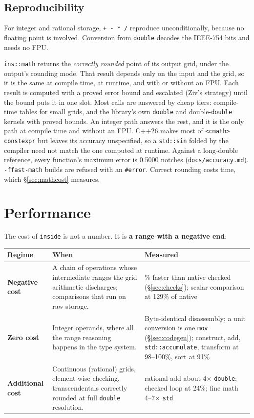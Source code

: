 \documentclass[11pt,a4paper]{article}
\newcommand{\code}[1]{\texttt{\small #1}}
\newcommand{\file}[1]{\texttt{\small #1}}
\begin{document}
\subsection{Reproducibility}

For integer and rational storage, \code{+ - * /} reproduce unconditionally,
because no floating point is involved. Conversion from \code{double} decodes
the IEEE-754 bits and needs no FPU.

\code{ins::math} returns the \emph{correctly rounded} point of its
output grid, under the output's rounding mode. That result depends only on the
input and the grid, so it is the same at compile time, at runtime, and with or
without an FPU. Each result is computed with a proved error bound and escalated
(Ziv's strategy) until the bound puts it in one slot. Most calls are answered
by cheap tiers: compile-time tables for small grids, and the library's own
\code{double} and double-\code{double} kernels with proved bounds. An integer
path answers the rest, and it is the only path at compile time and without an
FPU. C++26 makes most of \code{<cmath>} \code{constexpr} but leaves its
accuracy unspecified, so a \code{std::sin} folded by the compiler need not
match the one computed at runtime. Against a long-double reference, every function's maximum error is 0.5000
notches (\file{docs/accuracy.md}). \code{-ffast-math} builds are refused with
an \code{\#error}. Correct rounding costs time, which
\S\ref{sec:mathcost} measures.

\section{Performance}\label{sec:performance}

The cost of \code{inside} is not a number. It is \textbf{a range with a
negative end}:

\begin{center}
\small
\begin{tabular}{@{}l >{\raggedright\arraybackslash}p{5.1cm} >{\raggedright\arraybackslash}p{5.9cm}@{}}
\toprule
Regime & When & Measured \\
\midrule
\textbf{Negative cost} & A chain of operations whose intermediate ranges the
grid arithmetic discharges; comparisons that run on raw storage. &
21\% faster than native checked (\S\ref{sec:checks}); scalar comparison at
129\% of native \\[0.6em]
\textbf{Zero cost} & Integer operands, where all the range reasoning happens in
the type system. &
Byte-identical disassembly; a unit conversion is one \code{mov}
(\S\ref{sec:codegen}); construct, add,
\code{std::accumulate}, transform at 98--100\%, sort at 91\% \\[0.6em]
\textbf{Additional cost} & Continuous (rational) grids, element-wise checking,
transcendentals correctly rounded at full \code{double} resolution. &
rational add about 4$\times$ \code{double}; checked loop at 24\%; fine math
4--7$\times$ \code{std} \\
\bottomrule
\end{tabular}
\end{center}
\end{document}
